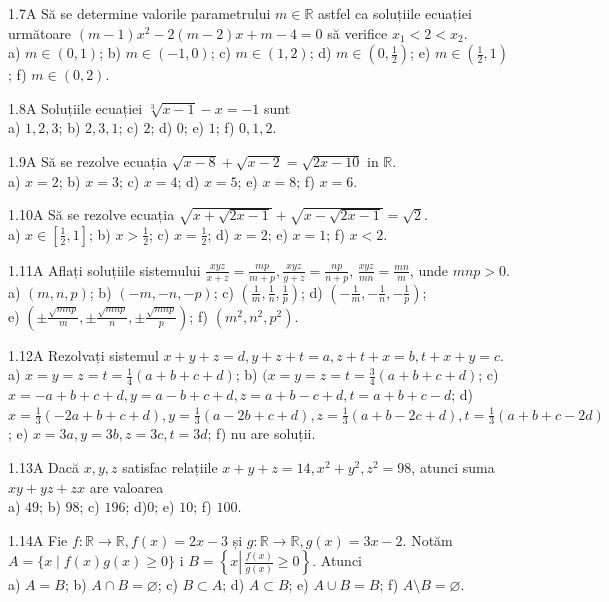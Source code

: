 \documentclass[11pt]{article}
\begin{document}
1.7A Să se determine valorile parametrului $m \in \mathbb{R}$ astfel ca soluțiile ecuației următoare $(m-1) x^{2}-2(m-2) x+m-4=0$ să verifice $x_{1}<2<x_{2}$.\\ a) $m \in(0,1)$; b) $m \in(-1,0)$; c) $m \in(1,2)$; d) $m \in\left(0, \frac{1}{2}\right)$; e) $m \in\left(\frac{1}{2}, 1\right)$; f) $m \in(0,2)$.

1.8A Soluțiile ecuației $\sqrt[3]{x-1}-x=-1$ sunt\\ a) $1,2,3$; b) $2,3,1$; c) $2$; d) $0$; e) $1$; f) $0,1,2$.

1.9A Să se rezolve ecuația $\sqrt{x-8}+\sqrt{x-2}=\sqrt{2 x-10}$ in $\mathbb{R}$.\\ a) $x=2$; b) $x=3$; c) $x=4$; d) $x=5$; e) $x=8$; f) $x=6$.

1.10A Să se rezolve ecuația $\sqrt{x+\sqrt{2 x-1}}+\sqrt{x-\sqrt{2 x-1}}=\sqrt{2}$.\\ a) $x \in\left[\frac{1}{2}, 1\right]$; b) $x>\frac{1}{2}$; c) $x=\frac{1}{2}$; d) $x=2$; e) $x=1$; f) $x<2$.

1.11A Aflați soluțiile sistemului $\frac{x y z}{x+z}=\frac{m p}{m+p},\frac{x y z}{y+z}=\frac{n p}{n+p}$, $\frac{x y z}{m n}=\frac{m n}{m}$, unde $mnp>0$.\\ a) $(m,n,p)$; b) $(-m,-n,-p)$; c) $(\frac{1}{m},\frac{1}{n},\frac{1}{p})$; d) $(-\frac{1}{m},-\frac{1}{n},-\frac{1}{p})$;\\ e) $(\pm \frac{\sqrt{mnp}}{m},\pm \frac{\sqrt{mnp}}{n},\pm \frac{\sqrt{mnp}}{p})$; f) $(m^{2},n^{2},p^{2})$.

1.12A Rezolvați sistemul $x+y+z=d, y+z+t=a, z+t+x=b, t+x+y=c$.\\ a) $x=y=z=t=\frac{1}{4}(a+b+c+d)$; b) $(x=y=z=t=\frac{3}{4}(a+b+c+d)$; c) $x=-a+b+c+d, y=a-b+c+d, z=a+b-c+d, t=a+b+c-d$; d) $x=\frac{1}{3}(-2a+b+c+d), y=\frac{1}{3}(a-2b+c+d), z=\frac{1}{3}(a+b-2c+d), t=\frac{1}{3}(a+b+c-2d)$; e) $x=3a, y =3b, z= 3c, t=3d$; f) nu are soluții.

1.13A Dacă $x,y,z$ satisfac relațiile $x+y+z=14, x^{2}+y^{2},z^{2}=98$, atunci suma $xy+yz+zx$ are valoarea\\ a) $49$; b) $98$; c) $196$; d)$0$; e) $10$; f) $100$.

1.14A Fie $f: \mathbb{R} \rightarrow \mathbb{R}, f(x)=2x-3$ și $g: \mathbb{R} \rightarrow \mathbb{R}, g(x)=3 x-2$. Notăm $A=\{x \mid f(x) g(x) \geq 0\}$ i $B=\left\{x \left\lvert\, \frac{f(x)}{g(x)} \geq 0\right.\right\}$. Atunci\\ a) $A=B$; b) $A \cap B=\varnothing$; c) $B \subset A$; d) $A \subset B$; e) $A \cup B=B$; f) $A \setminus B=\varnothing$.
\end{document}
